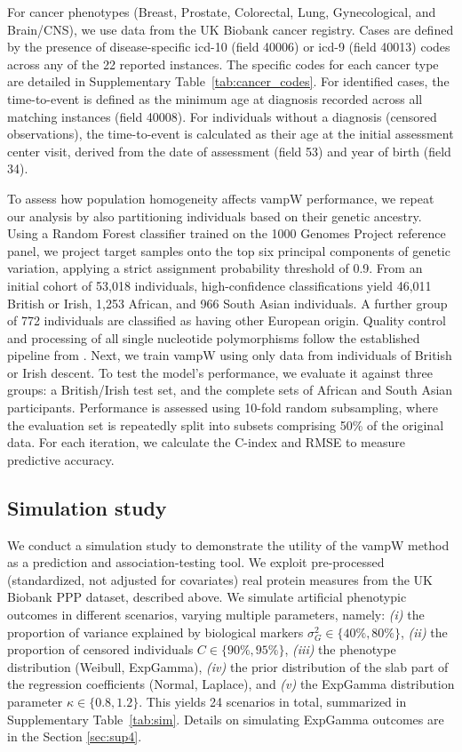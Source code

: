 For cancer phenotypes (Breast, Prostate, Colorectal, Lung, Gynecological, and Brain/CNS), we use data from the UK Biobank cancer registry. Cases are defined by the presence of disease-specific \gls{icd}-10 (field 40006) or \gls{icd}-9 (field 40013) codes across any of the 22 reported instances. The specific codes for each cancer type are detailed in Supplementary Table~\ref{tab:cancer_codes}. For identified cases, the time-to-event is defined as the minimum age at diagnosis recorded across all matching instances (field 40008). For individuals without a diagnosis (censored observations), the time-to-event is calculated as their age at the initial assessment center visit, derived from the date of assessment (field 53) and year of birth (field 34).

To assess how population homogeneity affects vampW performance, we repeat our analysis by also partitioning individuals based on their genetic ancestry. %
Using a Random Forest classifier trained on the 1000 Genomes Project reference panel, we project target samples onto the top six principal components of genetic variation, applying a strict assignment probability threshold of 0.9. From an initial cohort of 53,018 individuals, high-confidence classifications yield 46,011 British or Irish, 1,253 African, and 966 South Asian individuals. A further group of 772 individuals are classified as having other European origin. Quality control and processing of all single nucleotide polymorphisms follow the established pipeline from \cite{prscsx}. Next, we train vampW using only data from individuals of British or Irish descent. To test the model’s performance, we evaluate it against three groups: a British/Irish test set, and the complete sets of African and South Asian participants. Performance is assessed using 10-fold random subsampling, where the evaluation set is repeatedly split into subsets comprising 50\% of the original data. For each iteration, we calculate the C-index and RMSE to measure predictive accuracy.

\subsection{Simulation study}
\label{sec:methods_sim}
We conduct a simulation study to demonstrate the utility of the vampW method as a prediction and association-testing tool. We exploit pre-processed (standardized, not adjusted for covariates) real protein measures from the UK Biobank PPP dataset, described above. We simulate artificial phenotypic outcomes in different scenarios, varying multiple parameters, namely: \emph{(i)} the proportion of variance explained by biological markers $\sigma_G^2 \in \{40\%, 80\%\}$, \emph{(ii)} the proportion of censored individuals $C \in \{90\%, 95\%\}$, \emph{(iii)} the phenotype distribution (Weibull, ExpGamma), \emph{(iv)} the prior distribution of the slab part of the regression coefficients (Normal, Laplace), and \emph{(v)} the ExpGamma distribution parameter $\kappa \in \{0.8, 1.2\}$. This yields 24 scenarios in total, summarized in Supplementary Table~\ref{tab:sim}. Details on simulating ExpGamma outcomes are in the Section \ref{sec:sup4}.

